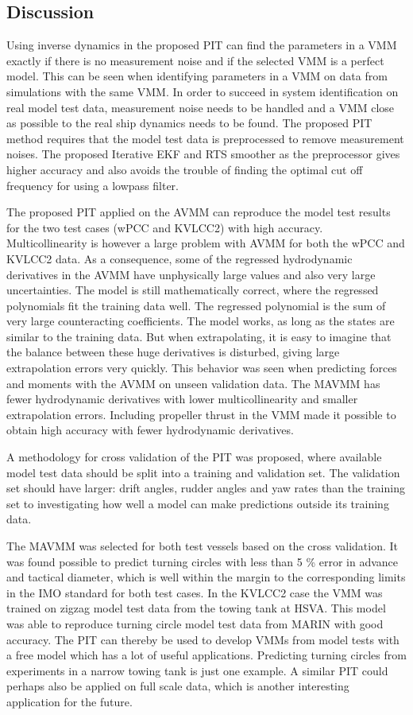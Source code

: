\documentclass[review]{elsarticle}
\begin{document}
\subsection{Discussion}
Using inverse dynamics in the proposed PIT can find the parameters in a VMM exactly if there is no measurement noise and if the selected VMM is a perfect model. This can be seen when identifying parameters in a VMM on data from simulations with the same VMM. In order to succeed in system identification on real model test data, measurement noise needs to be handled and a VMM close as possible to the real ship dynamics needs to be found. The proposed PIT method requires that the model test data is preprocessed to remove measurement noises. The proposed Iterative EKF and RTS smoother as the preprocessor gives higher accuracy and also avoids the trouble of finding the optimal cut off frequency for using a low\sphinxhyphen{}pass filter.

\sphinxAtStartPar
The proposed PIT applied on the AVMM can reproduce the model test results for the two test cases (wPCC and KVLCC2) with high accuracy. Multicollinearity is however a large problem with AVMM for both the wPCC and KVLCC2 data. As a consequence, some of the regressed hydrodynamic derivatives in the AVMM have unphysically large values and also very large uncertainties. The model is still mathematically correct, where the regressed polynomials fit the training data well.
The regressed polynomial is the sum of very large counteracting coefficients. The model works, as long as the states are similar to the training data. But when extrapolating, it is easy to imagine that the balance between these huge derivatives is disturbed, giving large extrapolation errors very quickly. This behavior was seen when predicting forces and moments with the AVMM on unseen validation data.
The MAVMM has fewer hydrodynamic derivatives with lower multicollinearity and smaller extrapolation errors. Including propeller thrust in the VMM made it possible to obtain high accuracy with fewer hydrodynamic derivatives.

\sphinxAtStartPar
A methodology for cross validation of the PIT was proposed, where available model test data should be split into a training and validation set. The validation set should have larger: drift angles, rudder angles and yaw rates than the training set to investigating how well a model can make predictions outside its training data.

\sphinxAtStartPar
The MAVMM was selected for both test vessels based on the cross validation. It was found possible to predict turning circles with less than 5 \% error in advance and tactical diameter, which is well within the margin to the corresponding limits in the IMO standard for both test cases. In the KVLCC2 case the VMM was trained on zigzag model test data from the towing tank at HSVA. This model was able to reproduce turning circle model test data from MARIN with good accuracy. The PIT can thereby be used to develop VMMs from model tests with a free model which has a lot of useful applications. Predicting turning circles from experiments in a narrow towing tank is just one example. A similar PIT could perhaps also be applied on full scale data, which is another interesting application for the future.
\end{document}
